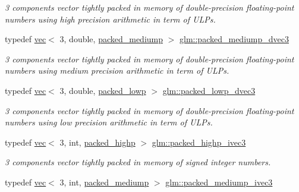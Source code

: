 \begin{DoxyCompactItemize}
\begin{DoxyCompactList}\small\item\em 3 components vector tightly packed in memory of double-\/precision floating-\/point numbers using high precision arithmetic in term of U\+L\+Ps. \end{DoxyCompactList}\item 
typedef \mbox{\hyperlink{structglm_1_1vec}{vec}}$<$ 3, double, \mbox{\hyperlink{namespaceglm_a36ed105b07c7746804d7fdc7cc90ff25a9604654c3b137cd7898689fd34b25bc0}{packed\+\_\+mediump}} $>$ \mbox{\hyperlink{group__gtc__type__aligned_ga0c34c771e940f66eccff81d402f83cdd}{glm\+::packed\+\_\+mediump\+\_\+dvec3}}
\begin{DoxyCompactList}\small\item\em 3 components vector tightly packed in memory of double-\/precision floating-\/point numbers using medium precision arithmetic in term of U\+L\+Ps. \end{DoxyCompactList}\item 
typedef \mbox{\hyperlink{structglm_1_1vec}{vec}}$<$ 3, double, \mbox{\hyperlink{namespaceglm_a36ed105b07c7746804d7fdc7cc90ff25ac36a4bd74559be2c0b65bc48e5953b8b}{packed\+\_\+lowp}} $>$ \mbox{\hyperlink{group__gtc__type__aligned_ga1e9e7d228165ce69595237084e2c1458}{glm\+::packed\+\_\+lowp\+\_\+dvec3}}
\begin{DoxyCompactList}\small\item\em 3 components vector tightly packed in memory of double-\/precision floating-\/point numbers using low precision arithmetic in term of U\+L\+Ps. \end{DoxyCompactList}\item 
typedef \mbox{\hyperlink{structglm_1_1vec}{vec}}$<$ 3, int, \mbox{\hyperlink{namespaceglm_a36ed105b07c7746804d7fdc7cc90ff25a8e8791ee77fe079b1291f710d88031bf}{packed\+\_\+highp}} $>$ \mbox{\hyperlink{group__gtc__type__aligned_ga56b9f0123506edc416bbcf957d3ce678}{glm\+::packed\+\_\+highp\+\_\+ivec3}}
\begin{DoxyCompactList}\small\item\em 3 components vector tightly packed in memory of signed integer numbers. \end{DoxyCompactList}\item 
typedef \mbox{\hyperlink{structglm_1_1vec}{vec}}$<$ 3, int, \mbox{\hyperlink{namespaceglm_a36ed105b07c7746804d7fdc7cc90ff25a9604654c3b137cd7898689fd34b25bc0}{packed\+\_\+mediump}} $>$ \mbox{\hyperlink{group__gtc__type__aligned_ga7f737483a80a724f8fde24e8402616f8}{glm\+::packed\+\_\+mediump\+\_\+ivec3}}

\end{DoxyCompactItemize}
